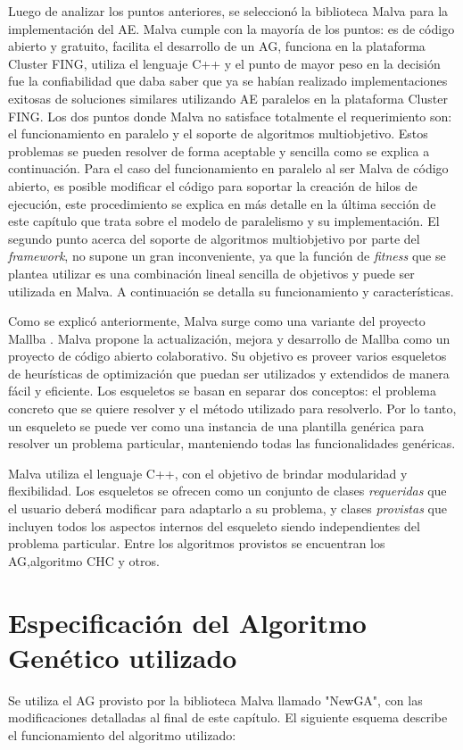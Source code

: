 Luego de analizar los puntos anteriores, se seleccionó la biblioteca Malva para la implementación del AE. Malva cumple con la mayoría de los puntos: es de código abierto y gratuito, facilita el desarrollo de un AG, funciona en la plataforma Cluster FING, utiliza el lenguaje C++ y el punto de mayor peso en la decisión fue la confiabilidad que daba saber que ya se habían realizado implementaciones exitosas de soluciones similares utilizando AE paralelos en la plataforma Cluster FING. Los dos puntos donde Malva no satisface totalmente el requerimiento son: el funcionamiento en paralelo y el soporte de algoritmos multiobjetivo. Estos problemas se pueden resolver de forma aceptable y sencilla como se explica a continuación. Para el caso del funcionamiento en paralelo al ser Malva de código abierto, es posible modificar el código para soportar la creación de hilos de ejecución, este procedimiento se explica en más detalle en la última sección de este capítulo que trata sobre el modelo de paralelismo y su implementación. El segundo punto acerca del soporte de algoritmos multiobjetivo por parte del \emph{framework}, no supone un gran inconveniente, ya que la función de \emph{fitness} que se plantea utilizar es una combinación lineal sencilla de objetivos y puede ser utilizada en Malva. A continuación se detalla su funcionamiento y características.

Como se explicó anteriormente, Malva \citep {Malva} surge como una variante del proyecto Mallba \citep{Mallba}. Malva propone la actualización, mejora y desarrollo de Mallba como un proyecto de código abierto colaborativo.  Su objetivo es proveer varios esqueletos de heurísticas de optimización que puedan ser utilizados y extendidos de manera fácil y eficiente. Los esqueletos se basan en separar dos conceptos: el problema concreto que se quiere resolver y el método utilizado para resolverlo. Por lo tanto, un esqueleto se puede ver como una instancia de una plantilla genérica para resolver un problema particular, manteniendo todas las funcionalidades genéricas.

Malva utiliza el lenguaje C++, con el objetivo de brindar modularidad y flexibilidad. Los esqueletos se ofrecen como un conjunto de clases \emph{requeridas} que el usuario deberá modificar para adaptarlo a su problema, y clases \emph{provistas} que incluyen todos los aspectos internos del esqueleto siendo  independientes del problema particular. Entre los algoritmos provistos se encuentran los AG,algoritmo  CHC \citep{CHC} y otros.


\section{Especificación del Algoritmo Genético utilizado}
Se utiliza el AG provisto por la biblioteca Malva llamado "NewGA", con las modificaciones detalladas al final de este capítulo. El siguiente esquema describe el funcionamiento del algoritmo utilizado:

